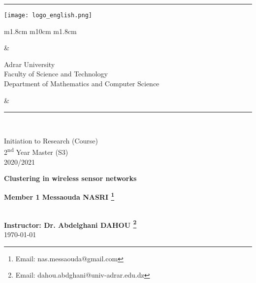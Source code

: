 \documentclass[paper=a4, fontsize=11pt]{scrartcl}
\numberwithin{equation}{section}		%
\numberwithin{figure}{section}			%
\numberwithin{table}{section}				%
\newcommand{\horrule}[1]{\rule{\linewidth}{#1}} 	%
\begin{document}
		
{\flushleft\horrule{2pt}
\begin{center}
{\texttt{[image: logo\_english.png]}} 
\begin{tabular}{ m{1.8cm} m{10cm} m{1.8cm}}
\begin{center}
\end{center}
&
\begin{center} 
{\small
{Adrar University} \\
{Faculty of Science and Technology} \\
{Department of Mathematics and Computer Science}} \\

\end{center}
&

\begin{center}
\end{center}
\end{tabular}
\end{center}
\flushleft \horrule{2pt}\\[1cm]
}


\begin{center}

{
\huge  
Initiation to Research (Course) \\
\vspace{0.2cm}
2\textsuperscript{nd} Year Master (S3) \\
\vspace{0.2cm}
2020/2021}\\

\vspace{1cm}

{
\Huge   
\textbf{Clustering in wireless sensor networks }}\\
\vspace{1cm}

{
\Large
\textbf{Member 1 Messaouda NASRI  \footnote{Email: nas.messaouda@gmail.com} \\ }}\\
\vspace{3cm}

{
\large
\textbf{Instructor: Dr. Abdelghani DAHOU \footnote{Email: dahou.abdghani@univ-adrar.edu.dz}}}\\
\today
\end{center}
\pagebreak
\tableofcontents
\pagebreak
\listoffigures
\pagebreak
\listoftables
\pagebreak
\end{document}
